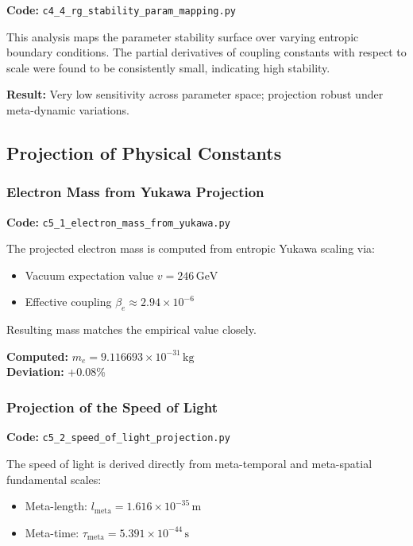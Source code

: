 \documentclass[10.5pt,a4paper]{article}
\begin{document}
\noindent\textbf{Code:} \texttt{c4\_4\_rg\_stability\_param\_mapping.py}

This analysis maps the parameter stability surface over varying entropic boundary conditions. The partial derivatives of coupling constants with respect to scale were found to be consistently small, indicating high stability.

\noindent\textbf{Result:} Very low sensitivity across parameter space; projection robust under meta-dynamic variations.

\subsection{Projection of Physical Constants}

\subsubsection{Electron Mass from Yukawa Projection}

\noindent\textbf{Code:} \texttt{c5\_1\_electron\_mass\_from\_yukawa.py}

The projected electron mass is computed from entropic Yukawa scaling via:

\begin{itemize}
    \item Vacuum expectation value \( v = 246\,\mathrm{GeV} \)
    \item Effective coupling \( \beta_e \approx 2.94 \times 10^{-6} \)
\end{itemize}

Resulting mass matches the empirical value closely.

\noindent\textbf{Computed:} \( m_e = 9.116693 \times 10^{-31} \,\mathrm{kg} \)\\
\textbf{Deviation:} +0.08\%

\subsubsection{Projection of the Speed of Light}

\noindent\textbf{Code:} \texttt{c5\_2\_speed\_of\_light\_projection.py}

The speed of light is derived directly from meta-temporal and meta-spatial fundamental scales:

\begin{itemize}
    \item Meta-length: \( l_{\mathrm{meta}} = 1.616 \times 10^{-35} \,\mathrm{m} \)
    \item Meta-time: \( \tau_{\mathrm{meta}} = 5.391 \times 10^{-44} \,\mathrm{s} \)
\end{itemize}
\end{document}
